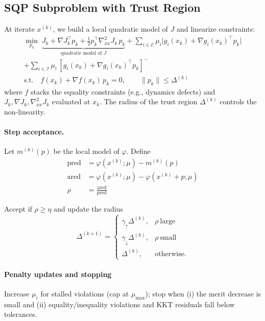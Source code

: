 \documentclass[conference]{IEEEtran}
\begin{document}
\subsection{SQP Subproblem with Trust Region}
\noindent At iterate $x^{(k)}$, we build a local quadratic model of $J$ and linearize constraints:
\begin{equation}
\label{eq:sqp}
\begin{aligned}
\min_{p_k}\; \underbrace{J_k+\nabla J_k^\top p_k+\tfrac12 p_k^\top \nabla^2_{xx}J_k\,p_k}_{\text{quadratic model of }J}
+\!\!\sum_{i\in\mathcal E}\!\mu_i\big|g_i(x_k)+\nabla g_i(x_k)^\top p_k\big| \\
+\!\!\sum_{i\in\mathcal I}\!\mu_i\,[g_i(x_k)+\nabla g_i(x_k)^\top p_k]^{-} \\
\text{s.t.}\quad f(x_k)+\nabla f(x_k)\,p_k=0,\qquad \|p_k\|\le \Delta^{(k)}
\end{aligned}
\end{equation}
where $f$ stacks the equality constraints (e.g., dynamics defects) and $J_k,\nabla J_k,\nabla^2_{xx}J_k$ evaluated at $x_k$. The radius of the trust region $\Delta^{(k)}$ controls the non-linearity.

\paragraph{Step acceptance.}
Let $m^{(k)}(p)$ be the local model of $\varphi$. Define
\[
\begin{aligned}
\mathrm{pred} &= \varphi(x^{(k)};\mu) - m^{(k)}(p) \\
\mathrm{ared} &= \varphi(x^{(k)};\mu) - \varphi(x^{(k)}\!+\!p;\mu) \\
\rho &= \frac{\mathrm{ared}}{\mathrm{pred}}
\end{aligned}
\]

Accept if $\rho\ge \eta$ and update the radius
\[
\Delta^{(k+1)}=
\begin{cases}
\gamma_{\uparrow}\Delta^{(k)},& \rho\ \text{large}\\
\gamma_{\downarrow}\Delta^{(k)},& \rho\ \text{small}\\
\Delta^{(k)},& \text{otherwise.}
\end{cases}
\]

\paragraph{Penalty updates and stopping}
Increase $\mu_i$ for stalled violations (cap at $\mu_{\max}$); stop when (i) the merit decrease is small and (ii) equality/inequality violations and KKT residuals fall below tolerances.
\end{document}
